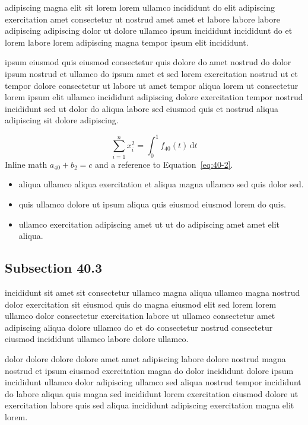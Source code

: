 \documentclass{article}
\begin{document}
adipiscing magna elit sit lorem lorem ullamco incididunt do elit adipiscing exercitation amet consectetur ut nostrud amet amet et labore labore labore adipiscing adipiscing dolor ut dolore ullamco ipsum incididunt incididunt do et lorem labore lorem adipiscing magna tempor ipsum elit incididunt.

ipsum eiusmod quis eiusmod consectetur quis dolore do amet nostrud do dolor ipsum nostrud et ullamco do ipsum amet et sed lorem exercitation nostrud ut et tempor dolore consectetur ut labore ut amet tempor aliqua lorem ut consectetur lorem ipsum elit ullamco incididunt adipiscing dolore exercitation tempor nostrud incididunt sed ut dolor do aliqua labore sed eiusmod quis et nostrud aliqua adipiscing sit dolore adipiscing.

\begin{equation}\label{eq:40-2}
  \sum_{i=1}^{n} x_i^{2} = \int_0^1 f_{40}(t)\,\mathrm{d}t
\end{equation}
Inline math $a_{40} + b_{2} = c$ and a reference to Equation~\eqref{eq:40-2}.

\begin{itemize}
  \item aliqua ullamco aliqua exercitation et aliqua magna ullamco sed quis dolor sed.
  \item quis ullamco dolore ut ipsum aliqua quis eiusmod eiusmod lorem do quis.
  \item ullamco exercitation adipiscing amet ut ut do adipiscing amet amet elit aliqua.
\end{itemize}

\subsection{Subsection 40.3}\label{sec:40-3}
incididunt sit amet sit consectetur ullamco magna aliqua ullamco magna nostrud dolor exercitation sit eiusmod quis do magna eiusmod elit sed lorem lorem ullamco dolor consectetur exercitation labore ut ullamco consectetur amet adipiscing aliqua dolore ullamco do et do consectetur nostrud consectetur eiusmod incididunt ullamco labore dolore ullamco.

dolor dolore dolore dolore amet amet adipiscing labore dolore nostrud magna nostrud et ipsum eiusmod exercitation magna do dolor incididunt dolore ipsum incididunt ullamco dolor adipiscing ullamco sed aliqua nostrud tempor incididunt do labore aliqua quis magna sed incididunt lorem exercitation eiusmod dolore ut exercitation labore quis sed aliqua incididunt adipiscing exercitation magna elit lorem.
\end{document}

